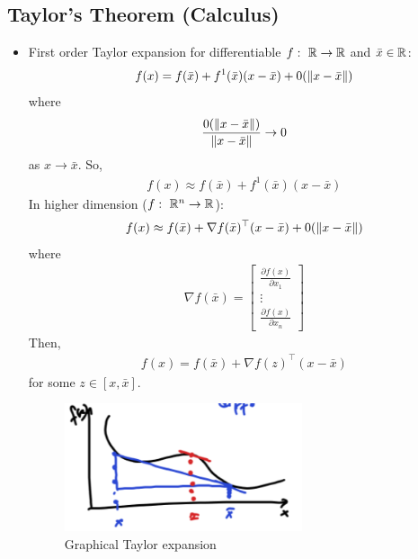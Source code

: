 \documentclass[11pt]{article}
\numberwithin{equation}{section}
\begin{document}
\subsection{Taylor's Theorem (Calculus)}
\begin{itemize}
    \item First order Taylor expansion for differentiable $f: \ \mathbb R \rightarrow \mathbb R$ and $\bar{x} \in \mathbb R$: \begin{align*}
        f(x) = f(\bar{x}) + f^1 (\bar{x})(x-\bar{x}) + 0(\left\| x-\bar{x} \right\|)
    \end{align*}
    where \begin{align*}
        \frac{0(\left\| x-\bar{x} \right\|)}{\left\| x-\bar{x} \right\|} \rightarrow 0
    \end{align*} as $x \rightarrow \bar{x}$. So, \begin{align*}
        f(x) \approx f(\bar{x}) + f^1(\bar{x})(x-\bar{x})
    \end{align*}
    In higher dimension ($f: \ \mathbb R^n \rightarrow \mathbb R$):
    \begin{align*}
        f(x) \approx f(\bar{x}) + \nabla f(\bar{x})^\top (x-\bar{x}) + 0(\left\| x-\bar{x} \right\|)
    \end{align*}
    where \begin{align*}
        \nabla f(\bar{x})=
            \begin{bmatrix}
                \frac{\partial f(x)}{\partial x_{1}} \\ 
                \vdots \\
                \frac{\partial f(x)}{\partial x_{n}}
                \end{bmatrix}
    \end{align*}
    Then, \begin{align*}
        f(x)=f(\bar{x})+\nabla f(z)^{\top}(x-\bar{x})
    \end{align*} for some $z \in \left[ x, \bar{x} \right]$. \begin{figure}[H]
        \centering
        \includegraphics[width=7cm]{images/9-ex-2.png}
        \caption{Graphical Taylor expansion}
    \end{figure}


\end{itemize}
\end{document}
